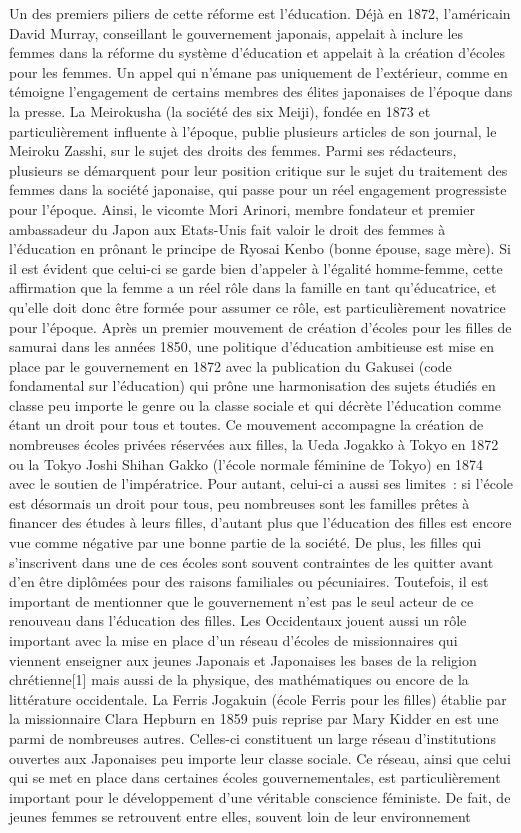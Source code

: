 \documentclass[11pt,a4paper]{article}
\begin{document}
Un des premiers piliers de cette réforme est l’éducation. Déjà en 1872, l’américain David Murray, conseillant le gouvernement japonais, appelait à inclure les femmes dans la réforme du système d’éducation et appelait à la création d'écoles pour les femmes. Un appel qui n’émane pas uniquement de l’extérieur, comme en témoigne l’engagement de certains membres des élites japonaises de l’époque dans la presse. La Meirokusha (la société des six Meiji), fondée en 1873 et particulièrement influente à l’époque, publie plusieurs articles de son journal, le Meiroku Zasshi, sur le sujet des droits des femmes. Parmi ses rédacteurs, plusieurs se démarquent pour leur position critique sur le sujet du traitement des femmes dans la société japonaise, qui passe pour un réel engagement progressiste pour l’époque. Ainsi, le vicomte Mori Arinori, membre fondateur et premier ambassadeur du Japon aux Etats-Unis fait valoir le droit des femmes à l’éducation en prônant le principe de Ryosai Kenbo (bonne épouse, sage mère). Si il est évident que celui-ci se garde bien d’appeler à l’égalité homme-femme, cette affirmation que la femme a un réel rôle dans la famille en tant qu’éducatrice, et qu’elle doit donc être formée pour assumer ce rôle, est particulièrement novatrice pour l’époque. Après un premier mouvement de création d’écoles pour les filles de samurai dans les années 1850, une politique d’éducation ambitieuse est mise en place par le gouvernement en 1872 avec la publication du Gakusei (code fondamental sur l’éducation) qui prône une harmonisation des sujets étudiés en classe peu importe le genre ou la classe sociale et qui décrète l’éducation comme étant un droit pour tous et toutes. Ce mouvement accompagne la création de nombreuses écoles privées réservées aux filles, la Ueda Jogakko à Tokyo en 1872 ou la Tokyo Joshi Shihan Gakko (l’école normale féminine de Tokyo) en 1874 avec le soutien de l’impératrice. Pour autant, celui-ci a aussi ses limites~: si l’école est désormais un droit pour tous, peu nombreuses sont les familles prêtes à financer des études à leurs filles, d’autant plus que l’éducation des filles est encore vue comme négative par une bonne partie de la société. De plus, les filles qui s’inscrivent dans une de ces écoles sont souvent contraintes de les quitter avant d’en être diplômées pour des raisons familiales ou pécuniaires. Toutefois, il est important de mentionner que le gouvernement n’est pas le seul acteur de ce renouveau dans l’éducation des filles. Les Occidentaux jouent aussi un rôle important avec la mise en place d’un réseau d’écoles de missionnaires qui viennent enseigner aux jeunes Japonais et Japonaises les bases de la religion chrétienne{[}1{]} mais aussi de la physique, des mathématiques ou encore de la littérature occidentale. La Ferris Jogakuin (école Ferris pour les filles) établie par la missionnaire Clara Hepburn en 1859 puis reprise par Mary Kidder en est une parmi de nombreuses autres. Celles-ci constituent un large réseau d'institutions ouvertes aux Japonaises peu importe leur classe sociale. Ce réseau, ainsi que celui qui se met en place dans certaines écoles gouvernementales, est particulièrement important pour le développement d’une véritable conscience féministe. De fait, de jeunes femmes se retrouvent entre elles, souvent loin de leur environnement 
\end{document}
